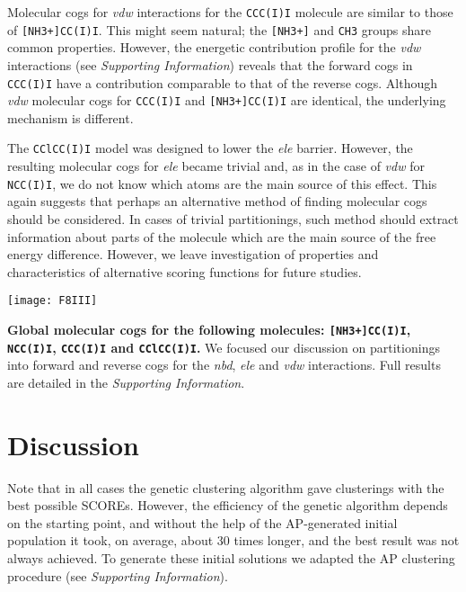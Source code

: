 \documentclass[a4paper,11pt,twoside]{book}%
\begin{document}
{Molecular cogs for \emph{vdw} interactions for the \texttt{CCC(I)I} molecule are similar to those of \texttt{[NH3+]CC(I)I}.
This might seem natural; the \texttt{[NH3+]} and \texttt{CH3} groups share common properties.
However, the energetic contribution profile for the \emph{vdw} interactions (see \emph{Supporting Information}) reveals that the forward cogs in \texttt{CCC(I)I} have a contribution comparable to that of the reverse cogs.
Although \emph{vdw} molecular cogs for \texttt{CCC(I)I} and \texttt{[NH3+]CC(I)I} are identical, the underlying mechanism is different.

The \texttt{CClCC(I)I} model was designed to lower the \emph{ele} barrier.
However, the resulting molecular cogs for \emph{ele} became trivial and, as in the case of \emph{vdw} for \texttt{NCC(I)I}, we do not know which atoms are the main source of this effect.
This again suggests that perhaps an alternative method of finding molecular cogs should be considered.
In cases of trivial partitionings, such method should extract information about parts of the molecule which are the main source of the free energy difference. 
However, we leave investigation of properties and characteristics of alternative scoring functions for future studies.

{
\centering
\begin{table}[H]
\centering
\texttt{[image: F8III]}
\caption{{\bf Global molecular cogs for the following molecules: \texttt{[NH3+]CC(I)I}, \texttt{NCC(I)I}, \texttt{CCC(I)I} and \texttt{CClCC(I)I}.}
We focused our discussion on partitionings into forward and reverse cogs for the \emph{nbd}, \emph{ele} and \emph{vdw} interactions.
Full results are detailed in the \emph{Supporting Information}.
}
\label{tab:molecularCogs}
\end{table}
}
}

\section{Discussion}

Note that in all cases the genetic clustering algorithm gave clusterings with the best possible SCOREs.
However, the efficiency of the genetic algorithm depends on the starting point, and without the help of the AP-generated initial population it took, on average, about 30 times longer, and the best result was not always achieved.
To generate these initial solutions we adapted the AP clustering procedure (see \emph{Supporting Information}).
\end{document}
